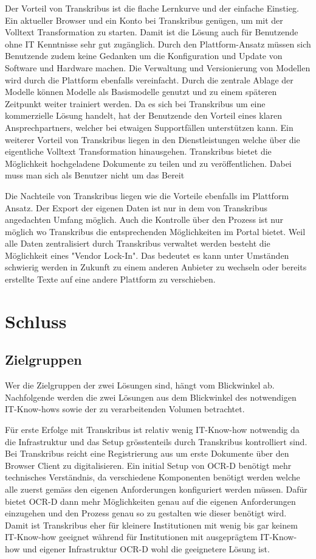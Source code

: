 \documentclass[a4paper,oneside, 12pt]{report}
\begin{document}
Der Vorteil von Transkribus ist die flache Lernkurve und der einfache Einstieg. Ein aktueller Browser und ein Konto bei Transkribus genügen, um mit der Volltext Transformation zu starten. Damit ist die Lösung auch für Benutzende ohne IT Kenntnisse sehr gut zugänglich. Durch den Plattform-Ansatz müssen sich Benutzende zudem keine Gedanken um die Konfiguration und Update von Software und Hardware machen. Die Verwaltung und Versionierung von Modellen wird durch die Plattform ebenfalls vereinfacht. Durch die zentrale Ablage der Modelle können Modelle als Basismodelle genutzt und zu einem späteren Zeitpunkt weiter trainiert werden. Da es sich bei Transkribus um eine kommerzielle Lösung handelt, hat der Benutzende den Vorteil eines klaren Ansprechpartners, welcher bei etwaigen Supportfällen unterstützen kann. Ein weiterer Vorteil von Transkribus liegen in den Dienstleistungen welche über die eigentliche Volltext Transformation hinausgehen. Transkribus bietet die Möglichkeit hochgeladene Dokumente zu teilen und zu veröffentlichen. Dabei muss man sich als Benutzer nicht um das Bereit

Die Nachteile von Transkribus liegen wie die Vorteile ebenfalls im Plattform Ansatz. Der Export der eigenen Daten ist nur in dem von Transkribus angedachten Umfang möglich. Auch die Kontrolle über den Prozess ist nur möglich wo Transkribus die entsprechenden Möglichkeiten im Portal bietet. Weil alle Daten zentralisiert durch Transkribus verwaltet werden besteht die Möglichkeit eines "Vendor Lock-In". Das bedeutet es kann unter Umständen schwierig werden in Zukunft zu einem anderen Anbieter zu wechseln oder bereits erstellte Texte auf eine andere Plattform zu verschieben.

\chapter{Schluss}\label{sec:schluss}

\section{Zielgruppen}
Wer die Zielgruppen der zwei Lösungen sind, hängt vom Blickwinkel ab. Nachfolgende werden die zwei Lösungen aus dem Blickwinkel des notwendigen IT-Know-hows sowie der zu verarbeitenden Volumen betrachtet.

Für erste Erfolge mit Transkribus ist relativ wenig IT-Know-how notwendig da die Infrastruktur und das Setup grösstenteils durch Transkribus kontrolliert sind. Bei Transkribus reicht eine Registrierung aus um erste Dokumente über den Browser Client zu digitalisieren. Ein initial Setup von OCR-D benötigt mehr technisches Verständnis, da verschiedene Komponenten benötigt werden welche alle zuerst gemäss den eigenen Anforderungen konfiguriert werden müssen. Dafür bietet OCR-D dann mehr Möglichkeiten genau auf die eigenen Anforderungen einzugehen und den Prozess genau so zu gestalten wie dieser benötigt wird.  Damit ist Transkribus eher für kleinere Institutionen mit wenig bis gar keinem IT-Know-how geeignet während für Institutionen mit ausgeprägtem IT-Know-how und eigener Infrastruktur OCR-D wohl die geeignetere Lösung ist.
\end{document}

